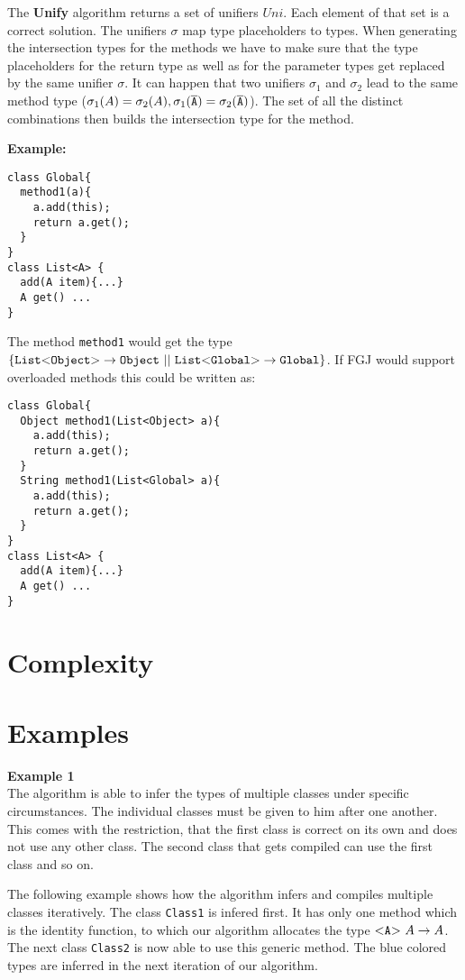 \documentclass[runningheads]{llncs}
\begin{document}
The \textbf{Unify} algorithm returns a set of unifiers ${Uni}$.
Each element of that set is a correct solution.
The unifiers $\sigma$ map type placeholders to types.
When generating the intersection types for the methods we have to make sure that the
type placeholders for the return type as well as for the parameter types get replaced by the same unifier $\sigma$.
It can happen that two unifiers $\sigma_1$ and $\sigma_2$ lead to the same method type ($\sigma_1(A) = \sigma_2(A), \sigma_1(\overline{\tt A}) = \sigma_2(\overline{\tt A})$).
The set of all the distinct combinations then builds the intersection type for the method.

\textbf{Example:}
\begin{lstlisting}
class Global{
  method1(a){
    a.add(this);
    return a.get();
  }
}
class List<A> {
  add(A item){...}
  A get() ...
}
\end{lstlisting}

The method \texttt{method1} would get the type $\{  \mathtt{List {\tt <} Object {\tt >} } \to \texttt{Object}
\ || \ \mathtt{List {\tt <} Global {\tt >} } \to \texttt{Global} \}$.
If FGJ would support overloaded methods this could be written as:
\begin{lstlisting}
class Global{
  Object method1(List<Object> a){
    a.add(this);
    return a.get();
  }
  String method1(List<Global> a){
    a.add(this);
    return a.get();
  }
}
class List<A> {
  add(A item){...}
  A get() ...
}
\end{lstlisting}

\section{Complexity}


\section{Examples}



\textbf{Example 1}\\
The algorithm is able to infer the types of multiple classes under specific circumstances.
The individual classes must be given to him after one another.
This comes with the restriction, that the first class is correct on its own and does not use any other class.
The second class that gets compiled can use the first class and so on.

The following example shows how the algorithm infers and compiles multiple classes iteratively.
The class \texttt{Class1} is infered first.
It has only one method which is the identity function,
to which our algorithm allocates the type $\mathtt{ {\tt <} A {\tt >} }\ A \to A$.
The next class \texttt{Class2} is now able to use this generic method.
The blue colored types are inferred in the next iteration of our algorithm.
\end{document}
